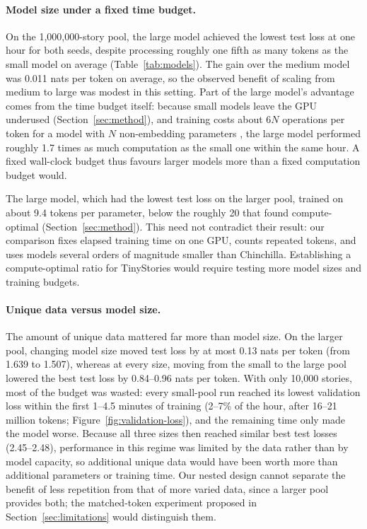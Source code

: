 \documentclass[12pt]{article}
\begin{document}
\paragraph{Model size under a fixed time budget.}
On the 1,000,000-story pool, the large model achieved the lowest
test loss at one hour for both seeds, despite processing roughly
one fifth as many tokens as the small model on average
(Table~\ref{tab:models}). The gain over the medium model was
0.011 nats per token on average, so the observed benefit of scaling
from medium to large was modest in this setting. Part of the large model's advantage comes from the time budget itself: because small models leave the GPU underused (Section~\ref{sec:method}), and training costs about $6N$ operations per token for a model with $N$ non-embedding parameters \citep{kaplan2020scaling}, the large model performed roughly 1.7 times as much computation as the small one within the same hour. A fixed wall-clock budget thus favours larger models more than a fixed computation budget would.

The large model, which had the lowest test loss on the larger pool, trained on about 9.4 tokens per parameter, below the roughly 20 that \citet{hoffmann2022training} found compute-optimal (Section~\ref{sec:method}). This need not contradict their result: our comparison fixes elapsed training time on one GPU, counts repeated tokens, and uses models several orders of magnitude smaller than Chinchilla. Establishing a compute-optimal ratio for TinyStories would require testing more model sizes and training budgets.

\paragraph{Unique data versus model size.} The amount of unique data mattered far more than model size. On the larger pool, changing model size moved test loss by at most 0.13 nats per token (from 1.639 to 1.507), whereas at every size, moving from the small to the large pool lowered the best test loss by 0.84--0.96 nats per token. With only 10,000 stories, most of the budget was wasted: every small-pool run reached its lowest validation loss within the first 1--4.5 minutes of training (2--7\% of the hour, after 16--21 million tokens; Figure~\ref{fig:validation-loss}), and the remaining time only made the model worse. Because all three sizes then reached similar best test losses (2.45--2.48), performance in this regime was limited by the data rather than by model capacity, so additional unique data would have been worth more than additional parameters or training time. Our nested design cannot separate the benefit of less repetition from that of more varied data, since a larger pool provides both; the matched-token experiment proposed in Section~\ref{sec:limitations} would distinguish them.
\end{document}
